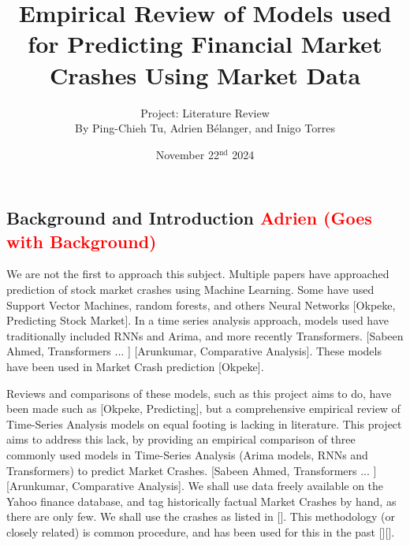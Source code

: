 \documentclass[12pt, letterpaper]{article}
\title{Empirical Review of Models used for Predicting Financial Market Crashes Using Market Data}
\author{\large Project: Literature Review \vspace{0.75em} \\ \normalsize By Ping-Chieh Tu, Adrien Bélanger, and Inigo Torres}
\date{November 22$^{\text{nd}}$ 2024}
\begin{document}
\maketitle 

\justifying %
\begin{comment}
Overall objective to keep in mind:

"In this milestone, the objective is to review the related literature to your proposal. This will better inform your methodology for your project if it involves a new idea, and it is necessary if you are comparing existing methods for a certain domain. It may even lead to a change of proposal, once you learn about existing methods out there. If you are producing a literature survey on a research topic, in this stage, you just provide a "breadth" review, in which you emphasize covering as many related works as possible and providing some preliminary organization without going into much detail."\\

Evaluation Criterias:

- Putting your proposal into context of related literature

- Coverage (are you adequately covering most relevant works)
\end{comment}
\subsection*{Background and Introduction \textcolor{red}{Adrien (Goes with Background)} }
We are not the first to approach this subject. 
Multiple papers have approached prediction of stock market crashes using Machine Learning. 
Some have used Support Vector Machines, random forests, and others Neural Networks [Okpeke, Predicting Stock Market]. 
In a time series analysis approach, models used have traditionally included RNNs and Arima, and more recently Transformers. [Sabeen Ahmed, Transformers ... ] [Arunkumar, Comparative Analysis]. 
These models have been used in Market Crash prediction [Okpeke]. 


Reviews and comparisons of these models, such as this project aims to do, have been made such as [Okpeke, Predicting], but a comprehensive empirical review of Time-Series Analysis models on equal footing is lacking in literature. 
This project aims to address this lack, by providing an empirical comparison of three commonly used models in Time-Series Analysis (Arima models, RNNs and Transformers) to predict Market Crashes. [Sabeen Ahmed, Transformers ... ] [Arunkumar, Comparative Analysis]. 
We shall use data freely available on the Yahoo finance database, and tag historically factual Market Crashes by hand, as there are only few. We shall use the crashes as listed in []. This methodology (or closely related) is common procedure, and has been used for this in the past [][].
\end{document}
